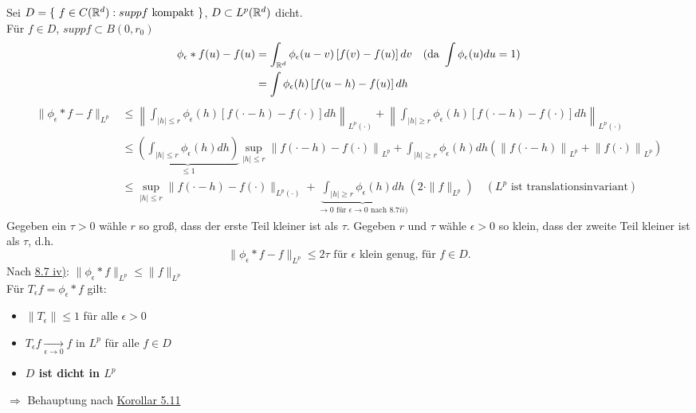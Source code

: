 \begin{beweis}
	Sei $D = \{ f \in C(\MdR^{d}): supp f \text{ kompakt } \}$, $D \subset L^{p}(\mathbb{R}^{d})$ dicht. \\
	Für $f \in D$, $supp f \subset B(0, r_{0})$
	\begin{align*}
		\phi_{\epsilon} \ast f(u) - f(u) & = \int_{\mathbb{R}^{d}} \phi_{\epsilon}(u - v) \left[ f(v) - f(u) \right] dv \quad (\text{da } \int \phi_{\epsilon}(u) du = 1 ) \\
		& = \int \phi_{\epsilon}(h) \left[ f(u - h) - f(u) \right] dh
	\end{align*} 
	\begin{align*}
		\| \phi_{\epsilon} \ast f - f \|_{L^{p}} & \leq \left\| \int_{|h| \leq r} \phi_{\epsilon}(h) \left[ f(\cdot - h) - f(\cdot) \right] dh \right\|_{L^{p}(\cdot)} + \left\| \int_{|h| \geq r} \phi_{\epsilon}(h) \left[ f(\cdot - h) - f(\cdot) \right] dh \right\|_{L^{p}(\cdot)} \\
		& \leq \underbrace{\left( \int_{|h| \leq r} \phi_{\epsilon}(h) dh \right)}_{\leq 1} \sup_{|h| \leq r} \left\| f(\cdot - h) - f(\cdot) \right\|_{L^{p}} + \int_{|h| \geq r} \phi_{\epsilon}(h) dh \left( \left\| f(\cdot - h) \right\|_{L^{p}} + \left\| f(\cdot) \right\|_{L^{p}} \right) \\
		& \leq \sup_{|h| \leq r} \| f( \cdot - h) - f(\cdot) \|_{L^{p}(\cdot)} + \underbrace{\int_{|h| \geq r} \phi_{\epsilon}(h) dh}_{\rightarrow 0 \text{ für } \epsilon \rightarrow 0 \text{ nach } \hyperref[bem:8.7ii]{8.7 ii)}} \left( 2 \cdot \| f \|_{L^{p}} \right) \quad  (L^{p} \text{ ist translationsinvariant})
	\end{align*}
	Gegeben ein $\tau > 0$ wähle $r$ so gro{\ss}, dass der erste Teil kleiner ist als $\tau$. Gegeben $r$ und $\tau$ wähle $\epsilon >0$ so klein, dass der zweite Teil kleiner ist als $\tau$, d.h.
	\[ \|\phi_{\epsilon} \ast f - f \|_{L^{p}} \leq 2 \tau \text{ für } \epsilon \text{ klein genug, für } f \in D. \]
	Nach \hyperref[bem:8.7iv]{8.7 iv)}: $\| \phi_{\epsilon} \ast f \|_{L^{p}} \leq \| f \|_{L^{p}}$ \\
	Für $T_{\epsilon} f = \phi_{\epsilon} \ast f$ gilt: 
	\begin{itemize}
		\item $\| T_{\epsilon} \| \leq 1$ für alle $\epsilon > 0$
		\item $T_{\epsilon} f \xrightarrow[\epsilon \rightarrow 0]{} f$ in $L^{p}$ für alle $f \in D$
		\item \textbf{$D$ ist dicht in $L^{p}$}
	\end{itemize}
	$\Rightarrow$ Behauptung nach \hyperref[kor:1-5.11]{Korollar 5.11} %
\end{beweis}

